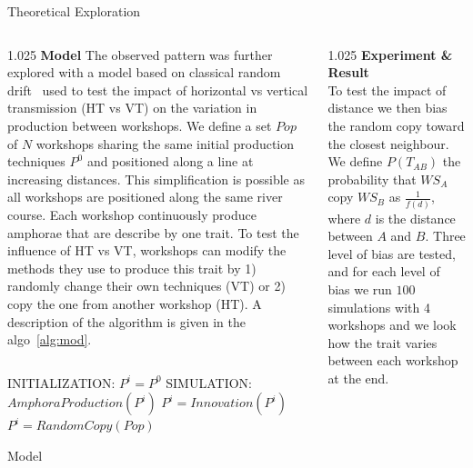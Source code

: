 \documentclass[final]{beamer}
\newcommand{\memo}[2]{\textcolor{#1}{#2}}
\newcommand{\xavi}[1]{\memo{orange}{#1\\}}
\newlength{\onecolwid}
\newlength{\twocolwid}
\begin{document}
\begin{frame}[t]
\begin{columns}[t]
\begin{column}{\twocolwid}
\begin{block}{Theoretical Exploration}
\begin{columns}[t,totalwidth=\twocolwid]
\begin{column}{1.025\onecolwid} %
{\textbf{Model }}
\justify
The observed pattern was further explored with a model based on classical random drift~\cite{bentley2004randomdriftandculturechange} used to test the impact of horizontal vs vertical transmission (HT vs VT) on the variation in production between workshops.  
We define a set $Pop$ of $N$ workshops sharing the same initial production techniques $P^{0}$ and positioned along a line at increasing distances. This simplification is possible as all workshops are positioned along the same river course.
Each workshop continuously produce amphorae that are describe by one trait. To test the influence of HT vs VT, workshops can modify the methods they use to produce this trait by 1) randomly change their own techniques (VT) or 2) copy the one from another workshop (HT). A description of the algorithm is given in the algo~\ref{alg:mod}.   
\vspace{-.7cm}
\begin{columns}
    \centering
    \begin{column}{.9\textwidth}
	\begin{algorithm}[H]
	    \begin{algorithmic}
		\footnotesize
		\State INITIALIZATION:
		\State $P^{i} = P^{0}$
		\EndFor
		\State SIMULATION:
		\State $AmphoraProduction(P^{i})$
		\State $P^{i}=Innovation(P^{i})$ 
		\State $P^{i}=RandomCopy(Pop)$	
		\EndIf
		\EndFor
		\EndLoop
	    \end{algorithmic}
	    \caption{Model }
	    \label{alg:mod}
	\end{algorithm}
    \end{column}
\end{columns}



\end{column}

\begin{column}{1.025\onecolwid} %
{\textbf{Experiment \& Result}}\\
\justify
To test the impact of distance we then bias the random copy toward the closest neighbour. We define $P(T_{AB})$ the probability that $WS_A$ copy $WS_B$ as $\frac{1}{f(d)}$, where $d$ is the distance between $A$ and $B$. Three level of bias are tested, and for each level of bias we run $100$ simulations with 4 workshops and we look how the trait varies between each workshop at the end.


\end{column}
\end{columns}
\end{block}
\end{column}
\end{columns}
\end{frame}
\end{document}
